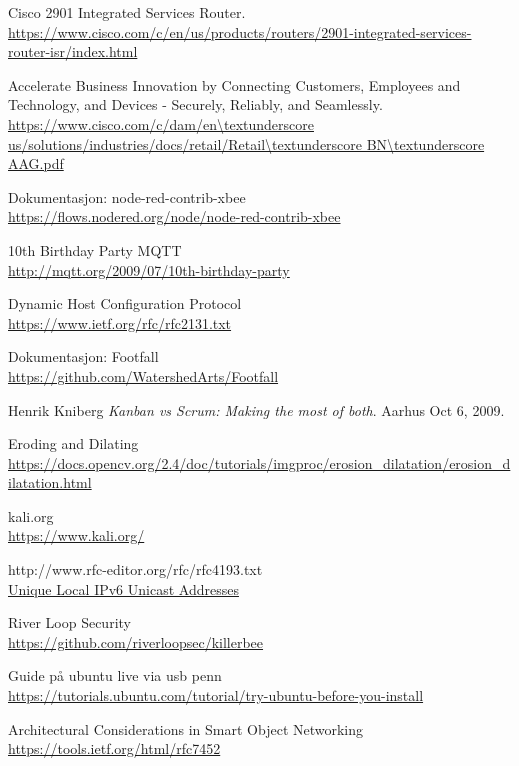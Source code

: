 \documentclass{article}
\begin{document}
\begin{thebibliography}{50}
Cisco 2901 Integrated Services Router.
\\\url{https://www.cisco.com/c/en/us/products/routers/2901-integrated-services-router-isr/index.html}

Accelerate Business Innovation by Connecting Customers, Employees and Technology,
and Devices - Securely, Reliably, and Seamlessly.
\\\url{https://www.cisco.com/c/dam/en\textunderscore us/solutions/industries/docs/retail/Retail\textunderscore BN\textunderscore AAG.pdf}

Dokumentasjon: node-red-contrib-xbee 
\\\url{https://flows.nodered.org/node/node-red-contrib-xbee}

10th Birthday Party MQTT
\\\url{http://mqtt.org/2009/07/10th-birthday-party}

Dynamic Host Configuration Protocol
\\\url{https://www.ietf.org/rfc/rfc2131.txt}

Dokumentasjon: Footfall
\\\url{https://github.com/WatershedArts/Footfall}

Henrik Kniberg
\textit{Kanban vs Scrum: Making the most of both}. 
Aarhus Oct 6, 2009.

Eroding and Dilating
\\\url{https://docs.opencv.org/2.4/doc/tutorials/imgproc/erosion_dilatation/erosion_dilatation.html}

kali.org
\\\url{https://www.kali.org/}

http://www.rfc-editor.org/rfc/rfc4193.txt
\\\url{Unique Local IPv6 Unicast Addresses}

River Loop Security
\\\url{https://github.com/riverloopsec/killerbee}

Guide på ubuntu live via usb penn
\\\url{https://tutorials.ubuntu.com/tutorial/try-ubuntu-before-you-install}

Architectural Considerations in Smart Object Networking
\\\url{https://tools.ietf.org/html/rfc7452}


\end{thebibliography}
\end{document}
